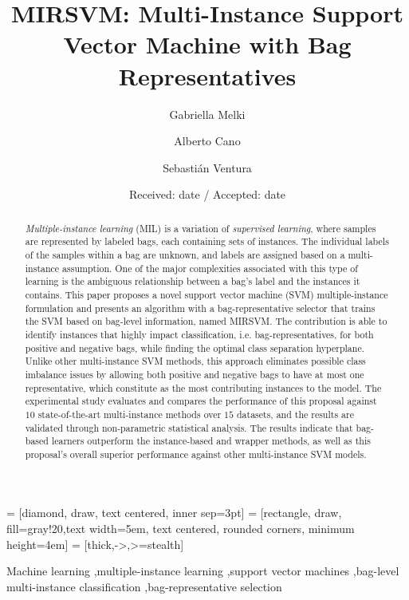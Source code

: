 \documentclass[preprint,12pt]{elsarticle}
\begin{document}
 = [diamond, draw, text centered, inner sep=3pt]
 = [rectangle, draw, fill=gray!20,text width=5em, text centered, rounded corners, minimum height=4em]
 = [thick,->,>=stealth]

\begin{frontmatter}

\title{MIRSVM: Multi-Instance Support Vector Machine with Bag Representatives}

\author[a]{Gabriella Melki}\author[a]{Alberto Cano}\author[b,c]{Sebasti\'an Ventura}
\address[a]{Department of Computer Science, Virginia Commonwealth University, USA}
\address[b]{Department of Computer Science and Numerical Analysis, University of Cordoba, Spain}
\address[c]{Department of Computer Science, King Abdulaziz University, Saudi Arabia Kingdom}

\date{Received: date / Accepted: date}

\begin{abstract}
\textit{Multiple-instance learning} (MIL) is a variation of \textit{supervised learning}, where samples are represented by labeled bags, each containing sets of instances. The individual labels of the samples within a bag are unknown, and labels are assigned based on a multi-instance assumption. One of the major complexities associated with this type of learning is the ambiguous relationship between a bag's label and the instances it contains. This paper proposes a novel support vector machine (SVM) multiple-instance formulation and presents an algorithm with a bag-representative selector that trains the SVM based on bag-level information, named MIRSVM. The contribution is able to identify instances that highly impact classification, i.e. bag-representatives, for both positive and negative bags, while finding the optimal class separation hyperplane. Unlike other multi-instance SVM methods, this approach eliminates possible class imbalance issues by allowing both positive and negative bags to have at most one representative, which constitute as the most contributing instances to the model. The experimental study evaluates and compares the performance of this proposal against $10$ state-of-the-art multi-instance methods over $15$ datasets, and the results are validated through non-parametric statistical analysis. The results indicate that bag-based learners outperform the instance-based and wrapper methods, as well as this proposal's overall superior performance against other multi-instance SVM models. 
\end{abstract}

\begin{keyword}
Machine learning \sep multiple-instance learning \sep support vector machines \sep bag-level multi-instance classification \sep bag-representative selection
\end{keyword}

\end{frontmatter}
\end{document}
